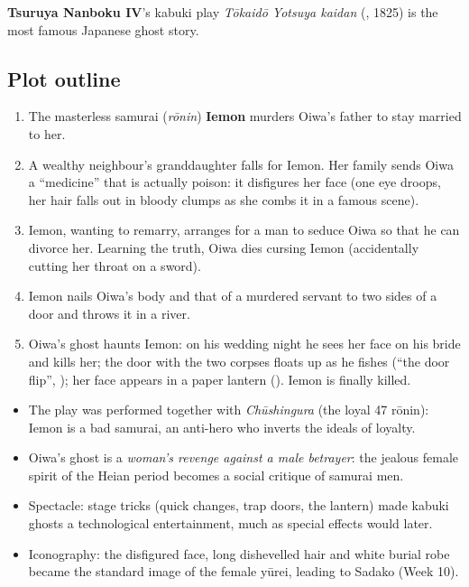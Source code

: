 \textbf{Tsuruya Nanboku IV}'s kabuki play \emph{Tōkaidō Yotsuya kaidan} (,
1825) is the most famous Japanese ghost story.

\subsection{Plot outline}

\begin{enumerate}
  \item The masterless samurai (\emph{rōnin}) \textbf{Iemon} murders Oiwa's father to
        stay married to her.
  \item A wealthy neighbour's granddaughter falls for Iemon. Her family sends Oiwa a
        ``medicine'' that is actually poison: it disfigures her face (one eye droops, her
        hair falls out in bloody clumps as she combs it in a famous scene).
  \item Iemon, wanting to remarry, arranges for a man to seduce Oiwa so that he can
        divorce her. Learning the truth, Oiwa dies cursing Iemon (accidentally cutting her
        throat on a sword).
  \item Iemon nails Oiwa's body and that of a murdered servant to two sides of a door and
        throws it in a river.
  \item Oiwa's ghost haunts Iemon: on his wedding night he sees her face on his bride and
        kills her; the door with the two corpses floats up as he fishes (``the door
        flip'', ); her face appears in a paper lantern (). Iemon
        is finally killed.
\end{enumerate}

\begin{important}
\begin{itemize}
  \item The play was performed together with \emph{Chūshingura} (the loyal 47 rōnin):
        Iemon is a bad samurai, an anti-hero who inverts the ideals of loyalty.
  \item Oiwa's ghost is a \emph{woman's revenge against a male betrayer}: the jealous female
        spirit of the Heian period becomes a social critique of samurai men.
  \item Spectacle: stage tricks (quick changes, trap doors, the lantern) made kabuki ghosts
        a technological entertainment, much as special effects would later.
  \item Iconography: the disfigured face, long dishevelled hair and white burial robe
        became the standard image of the female yūrei, leading to Sadako (Week 10).
\end{itemize}
\end{important}

